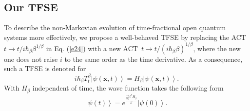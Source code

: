 \documentclass[
showpacs,  %
showkeys,  %
aps,       %
amsthm,    %
amsmath,   %
amsfonts,  %
amssymb    %
]{revtex4-1}          %
\begin{document}
\subsection{Our TFSE}
\label{subsec:34}
To describe the non-Markovian evolution of time-fractional open quantum systems more effectively, we propose a well-behaved TFSE by replacing the ACT $t\to t/i\hbar_\beta {\beta^{1/\beta}}$ in Eq. (\ref{e24}) with a new ACT $\,t \to t/{(i\hbar_\beta \beta)^{1/\beta}}$, where the new one does not raise $i$ to the same order as the time derivative. As a consequence, such a TFSE is denoted for
\begin{equation}
\label{e30}
{i\hbar_\beta}T_t^\beta \left| {\psi (\boldsymbol{x},t)} \right\rangle = {H_\beta }\left| {\psi (\boldsymbol{x},t)} \right\rangle.
\end{equation}
With ${H_\beta}$ independent of time, the wave function takes the following form
\begin{equation}
\label{e31}
\left| {\psi (t)} \right\rangle = {e^{\frac{{\frac{{ - i}}{{{\hbar _\beta }}}{t^\beta }{H_\beta }}}{\beta }}}\left| {\psi (0)} \right\rangle.
\end{equation}
\end{document}
